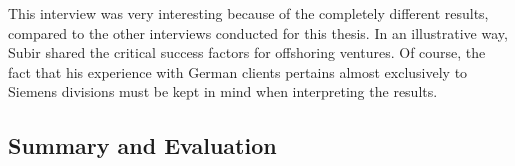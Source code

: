 This interview was very interesting because of the completely different results, compared to the other interviews conducted for this thesis. In an illustrative way, Subir shared the critical success factors for offshoring ventures. Of course, the fact that his experience with German clients pertains almost exclusively to Siemens divisions must be kept in mind when interpreting the results.

\subsection{Summary and Evaluation}






























